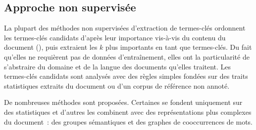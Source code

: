    \subsection{Approche non supervisée}
    \label{subsec:main-state_of_the_art-automatic_keyphrase_extraction-unsupervised_keyphrase_extraction}
      La plupart des méthodes non supervisées d'extraction de termes-clés
      ordonnent les termes-clés candidats d'après leur importance vis-à-vis du
      contenu du document (), puis extraient les $k$ plus
      importants en tant que termes-clés. Du fait qu'elles ne requièrent pas de
      données d'entraînement, elles ont la particularité de s'abstraire du
      domaine et de la langue des documents qu'elles traitent. Les termes-clés
      candidats sont analysés avec des règles simples fondées sur des traits
      statistiques extraits du document ou d'un corpus de référence non annoté.

      De nombreuses méthodes sont proposées. Certaines se fondent uniquement
      sur des statistiques et d'autres les combinent avec des représentations
      plus complexes du document~: des groupes sémantiques et des
      graphes de cooccurrences de mots.

